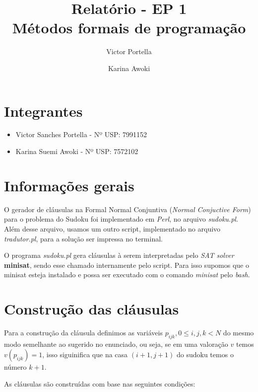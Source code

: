 \documentclass[11pt]{article}
\title{Relatório - EP 1 \\ Métodos formais de programação}
\author{Victor Portella \and Karina Awoki}
\begin{document}
\maketitle

\section{Integrantes}

\begin{itemize}

\item Victor Sanches Portella - Nº USP: 7991152

\item Karina Suemi Awoki - Nº USP: 7572102

\end{itemize}


\section{Informações gerais}

O gerador de cláusulas na Formal Normal Conjuntiva (\emph{Normal Conjuctive Form}) para o problema do Sudoku foi implementado em \emph{Perl}, no arquivo 
\emph{sudoku.pl}. Além desse arquivo, usamos um outro script, implementado no arquivo \emph{tradutor.pl}, para a solução ser impressa no terminal.

O programa \emph{sudoku.pl} gera cláusulas à serem interpretadas pelo \emph{SAT solver} \textbf{\color{red}minisat}, sendo esse chamado internamente pelo script. Para isso supomos que o minisat esteja instalado e possa ser executado com o comando \emph{minisat} pelo \emph{bash}.


\section{Construção das cláusulas}

Para a construção da cláusula definimos as variáveis $p_{ijk}, 0\leq i,j,k<N$ 
do mesmo modo semelhante ao sugerido no enunciado, ou seja, se em uma valoração $v$ temos $v(p_{ijk}) = 1$, isso siguinifica que na casa $(i+1,j+1)$ do sudoku temos o número $k+1$.

As cláusulas são construídas com base nas seguintes condições:
\end{document}
